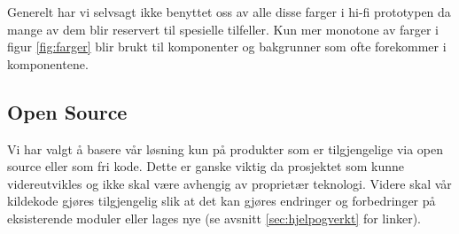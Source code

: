 Generelt har vi selvsagt ikke benyttet oss av alle disse farger i hi-fi prototypen da mange av dem blir reservert til spesielle tilfeller. Kun mer monotone av farger i figur \ref{fig:farger} blir brukt til komponenter og bakgrunner som ofte forekommer i komponentene.

\subsection{Open Source}
Vi har valgt å basere vår løsning kun på produkter som er tilgjengelige via open source eller som fri kode. Dette er ganske viktig da prosjektet som kunne videreutvikles og ikke skal være avhengig av proprietær teknologi. Videre skal vår kildekode gjøres tilgjengelig slik at det kan gjøres endringer og forbedringer på eksisterende moduler eller lages nye (se avsnitt \ref{sec:hjelpogverkt} for linker). 

